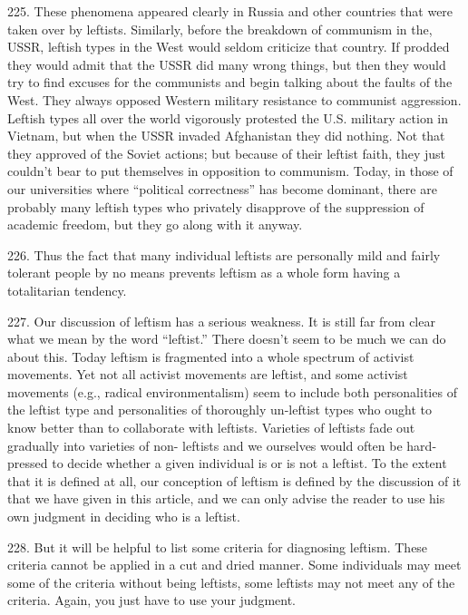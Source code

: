 \documentclass{article}
\begin{document}
225.  These  phenomena  appeared  clearly  in  Russia  and  other  countries  that  were  taken  over  by  
leftists.  Similarly, before the breakdown of communism in the, USSR, leftish types in the West 
would seldom criticize that country.  If prodded they would admit that the USSR did many wrong 
things,  but  then  they  would  try  to  find  excuses  for  the  communists  and  begin  talking  about  the  
faults of the West.  They always opposed Western military resistance to communist 
aggression.   Leftish  types  all  over  the  world  vigorously  protested  the  U.S. military  action  in  
Vietnam, but when the USSR invaded Afghanistan they did nothing.  Not that they approved of 
the Soviet actions; but because of their leftist faith, they just  couldn’t bear to put themselves in 
opposition to communism.  Today, in those of our universities where “political correctness” has 
become  dominant,  there  are  probably  many  leftish  types  who  privately  disapprove  of  the  
suppression of academic freedom, but they go along with it anyway. \vspace{\baselineskip}

226.  Thus the fact that many individual leftists are personally mild and fairly tolerant people by 
no means prevents leftism as a whole form having a totalitarian tendency. \vspace{\baselineskip} \newpage

227.  Our discussion of leftism has a serious weakness.  It is still far from clear what we mean by 
the  word  “leftist.”  There  doesn’t  seem  to  be  much  we  can  do  about  this.   Today  leftism  is  
fragmented  into  a  whole  spectrum  of  activist  movements.   Yet  not  all  activist  movements  are  
leftist,  and  some  activist  movements  (e.g.,  radical  environmentalism)  seem  to  include  both  
personalities of the leftist type and personalities of thoroughly un-leftist types who ought to know 
better than to collaborate with leftists.  Varieties of leftists fade out gradually into varieties of non-
leftists and we ourselves would often be hard-pressed to decide whether a given individual is or is 
not  a  leftist.   To  the  extent  that  it  is  defined  at  all,  our  conception  of  leftism  is  defined  by  the  
discussion of it that we have given in this article, and we can only advise the reader to use his own 
judgment in deciding who is a leftist. \vspace{\baselineskip}

228.  But it will be helpful to list some criteria for diagnosing leftism.  These criteria cannot be 
applied in a cut and dried manner.  Some individuals may meet some of the criteria without being 
leftists, some leftists may not meet any of the criteria.  Again, you just have to use your judgment. \vspace{\baselineskip}
\end{document}

